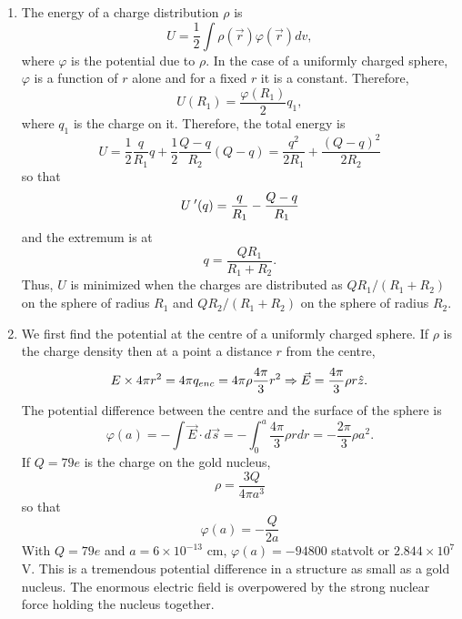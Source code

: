 \documentclass{article}
\begin{document}
\begin{enumerate}
\begin{verbatim}
a = 1
b = 1
sigma = 4/np.pi # Chosen so that 4\pi\sigma a = 1 !!
K = 4*np.pi*sigma*a

def E_field(z: float) -> float:
    return K*((4*a**2+(b-2*z)**2)**(-1/2)+\
              (4*a**2+(b+2*z)**2)**(-1/2))

def main():
    Z = np.linspace(-4*b, 4*b, 200)
    E = [E_field(z) for z in Z]
    plt.plot(Z, E)
    plt.axvline(x=-b/2, ls='--')
    plt.axvline(x=b/2, ls='--')
    plt.xlabel(r'$z$')
    plt.ylabel(r'$E(z)$')
    plt.title('Electric field in a charged cylinder')
    plt.savefig('course/purcell_c2p18.png')


if __name__ == '__main__':
    main()
\end{verbatim}
\begin{figure}[!ht]
\center
\texttt{[image: purcell\_c2p18]}
\caption{$E(z)$ for $a=1, b=1$. The cylinder extends from $z=-1/2$ to $z=1/2$.}
\label{c2f18}
\end{figure}

\item The energy of a charge distribution $\rho$ is
\[
U = \frac{1}{2}\int\rho(\vec{r})\varphi(\vec{r})dv,
\]
where $\varphi$ is the potential due to $\rho$. In the case of a uniformly charged
sphere, $\varphi$ is a function of $r$ alone and for a fixed $r$ it is a constant.
Therefore,
\[
U(R_1) = \frac{\varphi(R_1)}{2}q_1,
\]
where $q_1$ is the charge on it. Therefore, the total energy is
\[
U = \frac{1}{2}\frac{q}{R_1}q + \frac{1}{2}\frac{Q - q}{R_2}(Q - q)
= \frac{q^2}{2R_1} + \frac{(Q - q)^2}{2R_2}
\]
so that
\[
U^{\;\prime}(q) = \frac{q}{R_1} - \frac{Q - q}{R_1}
\]
and the extremum is at
\[
q = \frac{QR_1}{R_1 + R_2}.
\]
Thus, $U$ is minimized when the charges are distributed as $QR_1/(R_1+R_2)$ on
the sphere of radius $R_1$ and $QR_2/(R_1 + R_2)$ on the sphere of radius $R_2$.

\item We first find the potential at the centre of a uniformly charged sphere.
If $\rho$ is the charge density then at a point a distance $r$ from the centre,
\[
E \times 4\pi r^2 = 4\pi q_{enc} = 4\pi\rho\frac{4\pi}{3}r^2 \Rightarrow
\vec{E} = \frac{4\pi}{3}\rho r\hat{z}.
\]
The potential difference between the centre and the surface of the sphere is
\[
\varphi(a) = -\int\vec{E}\cdot d\vec{s} = -\int_0^a \frac{4\pi}{3}\rho rdr
= -\frac{2\pi}{3}\rho a^2.
\]
If $Q = 79e$ is the charge on the gold nucleus,
\[
\rho = \frac{3Q}{4\pi a^3}
\]
so that
\[
\varphi(a) = -\frac{Q}{2a}
\]
With $Q = 79e$ and $a = 6 \times 10^{-13}$ cm, $\varphi(a) = -94 800$ statvolt or
$2.844 \times 10^{7}$ V. This is a tremendous potential difference in a structure
as small as a gold nucleus. The enormous electric field is overpowered by the
strong nuclear force holding the nucleus together.


\end{enumerate}
\end{document}
